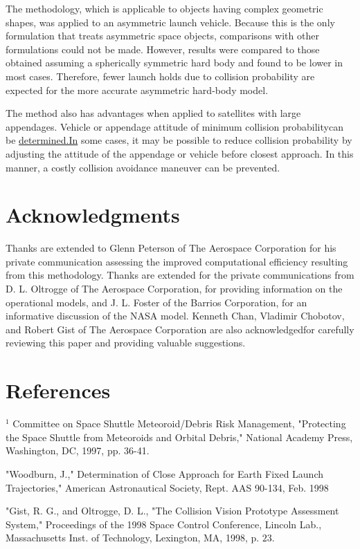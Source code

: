 \documentclass[10pt]{article}
\begin{document}
The methodology, which is applicable to objects having complex geometric shapes, was applied to an asymmetric launch vehicle. Because this is the only formulation that treats asymmetric space objects, comparisons with other formulations could not be made. However, results were compared to those obtained assuming a spherically symmetric hard body and found to be lower in most cases. Therefore, fewer launch holds due to collision probability are expected for the more accurate asymmetric hard-body model.

The method also has advantages when applied to satellites with large appendages. Vehicle or appendage attitude of minimum collision probabilitycan be \href{http://determined.In}{determined.In} some cases, it may be possible to reduce collision probability by adjusting the attitude of the appendage or vehicle before closest approach. In this manner, a costly collision avoidance maneuver can be prevented.

\section{Acknowledgments}
Thanks are extended to Glenn Peterson of The Aerospace Corporation for his private communication assessing the improved computational efficiency resulting from this methodology. Thanks are extended for the private communications from D. L. Oltrogge of The Aerospace Corporation, for providing information on the operational models, and J. L. Foster of the Barrios Corporation, for an informative discussion of the NASA model. Kenneth Chan, Vladimir Chobotov, and Robert Gist of The Aerospace Corporation are also acknowledgedfor carefully reviewing this paper and providing valuable suggestions.

\section{References}
${ }^{1}$ Committee on Space Shuttle Meteoroid/Debris Risk Management, "Protecting the Space Shuttle from Meteoroids and Orbital Debris," National Academy Press, Washington, DC, 1997, pp. 36-41.

"Woodburn, J.," Determination of Close Approach for Earth Fixed Launch Trajectories," American Astronautical Society, Rept. AAS 90-134, Feb. 1998

"Gist, R. G., and Oltrogge, D. L., "The Collision Vision Prototype Assessment System," Proceedings of the 1998 Space Control Conference, Lincoln Lab., Massachusetts Inst. of Technology, Lexington, MA, 1998, p. $23 .$
\end{document}
